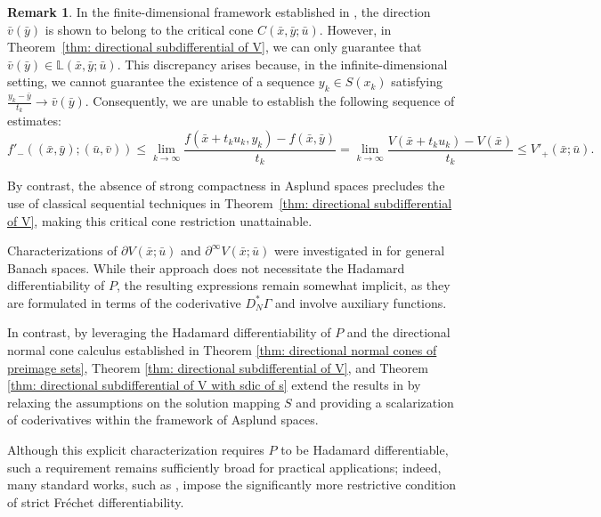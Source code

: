 \documentclass[12pt,twoside,reqno]{amsart}
\theoremstyle{definition}
\newtheorem{remark}[theorem]{Remark}
\numberwithin{equation}{section}
\begin{document}
\begin{remark}\label{rem: critical_cone}
    In the finite-dimensional framework established in \cite[Theorem 3.1]{Bai2023Directional}, the direction $\bar{v}(\bar{y})$ is shown to belong to the critical cone $C(\bar{x}, \bar{y}; \bar{u})$. However, in Theorem~\ref{thm: directional subdifferential of V}, we can only guarantee that $\bar{v}(\bar{y}) \in \mathbb{L}(\bar{x}, \bar{y}; \bar{u})$. This discrepancy arises because, in the infinite-dimensional setting, we cannot guarantee the existence of a sequence $y_k \in S(x_k)$ satisfying $\frac{y_k - \bar{y}}{t_k} \to \bar{v}(\bar{y})$. Consequently, we are unable to establish the following sequence of estimates:
    \begin{equation*}
        f'_{-}((\bar{x}, \bar{y}); (\bar{u}, \bar{v})) \leq \lim_{k \to \infty} \frac{f(\bar{x} + t_k u_k, y_k) - f(\bar{x}, \bar{y})}{t_k} = \lim_{k \to \infty} \frac{V(\bar{x} + t_k u_k) - V(\bar{x})}{t_k} \leq V'_{+}(\bar{x}; \bar{u}).
    \end{equation*} 
\end{remark}

By contrast, the absence of strong compactness in Asplund spaces precludes the use of classical sequential techniques in Theorem~\ref{thm: directional subdifferential of V}, making this critical cone restriction unattainable. 

Characterizations of $\partial V(\bar{x}; \bar u)$ and $\partial^\infty V(\bar{x}; \bar u)$ were investigated in \cite{long2017calculus} for general Banach spaces.  While their approach does not necessitate the Hadamard differentiability of $P$, the resulting expressions remain somewhat implicit, as they are formulated in terms of the coderivative $D_N^* \Gamma$ and involve auxiliary functions. 

In contrast, by leveraging the Hadamard differentiability of $P$ and the directional normal cone calculus established in Theorem \ref{thm: directional normal cones of preimage sets}, 
Theorem \ref{thm: directional subdifferential of V}, and Theorem \ref{thm: directional subdifferential of V with sdic of s} extend the results in \cite[Theorems 5.10, 5.11]{long2017calculus} by relaxing the assumptions on the solution mapping $S$ and providing a scalarization of coderivatives within the framework of Asplund spaces. 

Although this explicit characterization requires $P$ to be Hadamard differentiable, such a requirement remains sufficiently broad for practical applications; indeed, many standard works, such as \cite[Subsection 1.4.2]{hinze2008optimization}, impose the significantly more restrictive condition of strict Fr\'{e}chet differentiability. 
\end{document}
